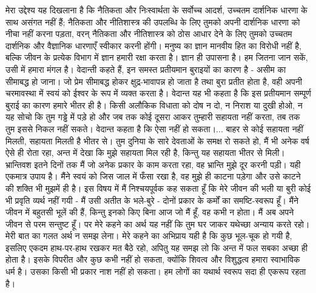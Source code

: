 मेरा उद्देश्य यह दिखलाना है कि नैतिकता और निःस्वार्थता के सर्वोच्च आदर्श, उच्चतम दार्शनिक धारणा के साथ असंगत नहीं हैं; नैतिकता और नीतिशास्त्र की उपलब्धि के लिए तुमको अपनी दार्शनिक धारणा को नीचा नहीं करना पड़ता, वरन् नैतिकता और नीतिशास्त्र को ठोस आधार देने के लिए तुमको उच्चतम दार्शनिक और वैज्ञानिक धारणाएँ स्वीकार करनी होंगी। मनुष्य का ज्ञान मानवीय हित का विरोधी नहीं है, बल्कि जीवन के प्रत्येक विभाग में ज्ञान हमारी रक्षा करता है। ज्ञान ही उपासना है। हम जितना जान सकें, उसी में हमारा मंगल है। वेदान्ती कहते हैं, इन समस्त प्रतीयमान बुराइयों का कारण है - असीम का सीमाबद्ध हो जाना। जो प्रेम सीमाबद्ध होकर क्षुद्र-भावापन्न हो जाता है तथा बुरा प्रतीत होता है, वही अपनी चरमावस्था में स्वयं को ईश्वर के रूप में व्यक्त करता है। वेदान्त यह भी कहता है कि इस प्रतीयमान सम्पूर्ण बुराई का कारण हमारे भीतर ही है। किसी अलौकिक विधाता को दोष न दो, न निराश या दुखी होओ, न यह सोचो कि तुम गड्ढे में पड़े हो और जब तक कोई दूसरा आकर तुम्हारी सहायता नहीं करता, तब तक तुम इससे निकल नहीं सकते। वेदान्त कहता है कि ऐसा नहीं हो सकता।... बाहर से कोई सहायता नहीं मिलती, सहायता मिलती है भीतर से। तुम दुनिया के सारे देवताओं के समक्ष रो सकते हो, मैं भी अनेक वर्ष ऐसे ही रोता रहा, अन्त में देखा कि मुझे सहायता मिल रही है, किन्तु यह सहायता भीतर से मिली। भ्रान्तिवश इतने दिनों तक मैं जो अनेक प्रकार के काम करता रहा, वह भ्रान्ति मुझे दूर करनी पड़ी। यही एकमात्र उपाय है। मैंने स्वयं को जिस जाल में फँसा रखा है, वह मुझे ही काटना पड़ेगा और उसे काटने की शक्ति भी मुझमें ही है। इस विषय में मैं निश्चयपूर्वक कह सकता हूँ कि मेरे जीवन की भली या बुरी कोई भी प्रवृति व्यर्थ नहीं गयी - मैं उसी अतीत के भले-बुरे - दोनों प्रकार के कर्मों का समष्टि-स्वरूप हूँ। मैंने जीवन में बहुतसी भूलें की हैं, किन्तु इनको किए बिना आज जो मैं हूँ, वह कभी न होता। मैं अब अपने जीवन से परम सन्तुष्ट हूँ। पर मेरे कहने का अर्थ यह नहीं कि तुम घर जाकर यथेच्छा अन्याय करते रहो। मेरी बात का गलत अर्थ न समझ लेना। मेरे कहने का अभिप्राय यही है कि कुछ भूल-चूक हो गयी है, इसलिए एकदम हाथ-पर-हाथ रखकर मत बैठे रहो, अपितु यह समझ लो कि अन्त में फल सबका अच्छा ही होता है। इसके विपरीत और कुछ कभी नहीं हो सकता, क्योंकि शिवत्व और विशुद्धत्व हमारा स्वाभाविक धर्म है। उसका किसी भी प्रकार नाश नहीं हो सकता। हम लोगों का यथार्थ स्वरूप सदा ही एकरूप रहता है। 

